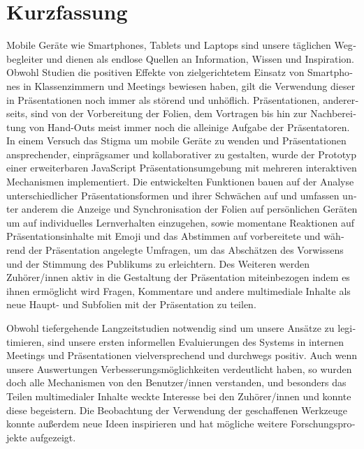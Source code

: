 \chapter{Kurzfassung}

\begin{german}
Mobile Geräte wie Smartphones, Tablets und Laptops sind unsere täglichen Wegbegleiter und dienen als endlose Quellen an Information, Wissen und Inspiration. Obwohl Studien die positiven Effekte von zielgerichtetem Einsatz von Smartphones in Klassenzimmern und Meetings bewiesen haben, gilt die Verwendung dieser in Präsentationen noch immer als störend und unhöflich. Präsentationen, andererseits, sind von der Vorbereitung der Folien, dem Vortragen bis hin zur Nachbereitung von Hand-Outs meist immer noch die alleinige Aufgabe der Präsentatoren. In einem Versuch das Stigma um mobile Geräte zu wenden und Präsentationen ansprechender, einprägsamer und kollaborativer zu gestalten, wurde der Prototyp einer erweiterbaren JavaScript Präsentationsumgebung mit mehreren interaktiven Mechanismen implementiert. Die entwickelten Funktionen bauen auf der Analyse unterschiedlicher Präsentationsformen und ihrer Schwächen auf und umfassen unter anderem die Anzeige und Synchronisation der Folien auf persönlichen Geräten um auf individuelles Lernverhalten einzugehen, sowie momentane Reaktionen auf Präsentationsinhalte mit Emoji und das Abstimmen auf vorbereitete und während der Präsentation angelegte Umfragen, um das Abschätzen des Vorwissens und der Stimmung des Publikums zu erleichtern. Des Weiteren werden Zuhörer/innen aktiv in die Gestaltung der Präsentation miteinbezogen indem es ihnen ermöglicht wird Fragen, Kommentare und andere multimediale Inhalte als neue Haupt- und Subfolien mit der Präsentation zu teilen.

Obwohl tiefergehende Langzeitstudien notwendig sind um unsere Ansätze zu legitimieren, sind unsere ersten informellen Evaluierungen des Systems in internen Meetings und Präsentationen vielversprechend und durchwegs positiv. Auch wenn unsere Auswertungen Verbesserungsmöglichkeiten verdeutlicht haben, so wurden doch alle Mechanismen von den Benutzer/innen verstanden, und besonders das Teilen multimedialer Inhalte weckte Interesse bei den Zuhörer/innen und konnte diese begeistern. Die Beobachtung der Verwendung der geschaffenen Werkzeuge konnte außerdem neue Ideen inspirieren und hat mögliche weitere Forschungsprojekte aufgezeigt.
\end{german}